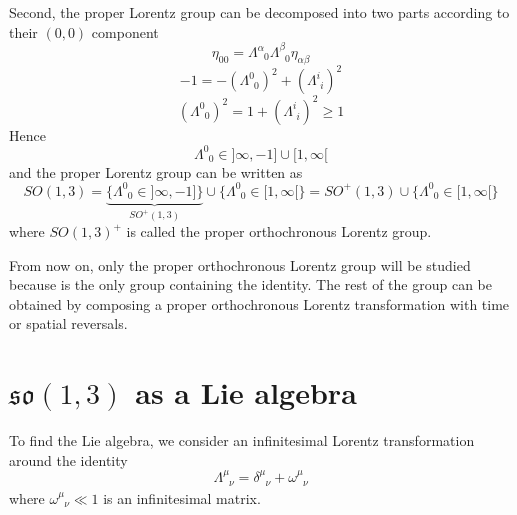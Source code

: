     Second, the proper Lorentz group can be decomposed into two parts according to their $(0, 0)$ component
    \begin{equation*}
        \eta_{00} = \Lambda^\alpha_{\phantom \alpha 0} \Lambda^\beta_{\phantom \beta 0} \eta_{\alpha \beta}
    \end{equation*}
    \begin{equation*}
        -1 = -(\Lambda^0_{\phantom 0 0})^2 + (\Lambda^i_{\phantom i i})^2
    \end{equation*}
    \begin{equation*}
        (\Lambda^0_{\phantom 0 0})^2 = 1 + (\Lambda^i_{\phantom i i})^2 \geq 1
    \end{equation*}
    Hence 
    \begin{equation*}
        \Lambda^0_{\phantom 0 0} \in ]\infty, -1] \cup [1, \infty[
    \end{equation*}
    and the proper Lorentz group can be written as
    \begin{equation*}
        SO(1,3) = \underbrace{\{\Lambda^0_{\phantom 0 0} \in ]\infty, -1]\}}_{SO^+(1,3)} \cup \{\Lambda^0_{\phantom 0 0} \in [1, \infty[\} = SO^+(1,3) \cup \{\Lambda^0_{\phantom 0 0} \in [1, \infty[\} 
    \end{equation*}
    where $SO(1,3)^+$ is called the proper orthochronous Lorentz group.

    From now on, only the proper orthochronous Lorentz group will be studied because is the only group containing the identity. The rest of the group can be obtained by composing a proper orthochronous Lorentz transformation with time or spatial reversals.

\section{$\mathfrak{so}(1,3)$ as a Lie algebra}

    To find the Lie algebra, we consider an infinitesimal Lorentz transformation around the identity 
    \begin{equation}\label{inf}
        \Lambda^{\mu}_{\phantom \mu \nu} = \delta^{\mu}_{\phantom \mu \nu} + \omega^{\mu}_{\phantom \mu \nu}
    \end{equation}
    where $\omega^{\mu}_{\phantom \mu \nu} \ll 1$ is an infinitesimal matrix. 

